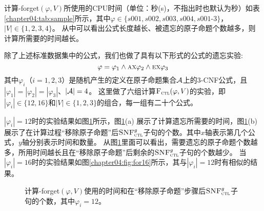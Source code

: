 计算{\CTL-forget}$(\varphi, V)$所使用的CPU时间（单位：秒(s)，不指出时也默认为秒）如表\ref{chapter04:tab:sample}所示，其中$\varphi\in \{s001,s002,s003,s004,s001$-$3\}$，$|V|\in \{1,2,3,4\}$。
从中可以看出公式长度越长、被遗忘的原子命题个数越多，则计算所需要的时间越长。

\begin{table}%
	\small
	\centering
	\caption{计算 {\CTL-forget}$(\varphi, V)$所使用的CPU时间（单位：秒(s)）}\label{chapter04:tab:sample}
\end{table}

除了上述标准数据集中的公式，我们也做了具有以下形式的公式的遗忘实验:
$$\varphi=\varphi_1 \wedge \textsc{a}\textsc{x} \varphi_2 \wedge \textsc{e}\textsc{x} \varphi_3$$
其中$\varphi_i$（$i=1,2,3$）是随机产生的定义在原子命题集合${\cal A}$上的3-CNF公式，且$|\varphi_1| = |\varphi_2| =|\varphi_3|$、$|{\cal A}|=4$。
这里做了六组计算${\textsc{F}_{\textsc{ctl}}}(\varphi,V)$的实验，即$|\varphi_i| \in \{12,16\}$和$|V|\in \{1,2,3\}$的组合，每一组有二十个公式。

$|\varphi_i|=12$时的实验结果如图\ref{chapter04:fig:for12}所示，图\ref{chapter04:fig:for12}(a) 展示了计算遗忘所需要的时间，图\ref{chapter04:fig:for12}(b)展示了在计算过程“移除原子命题”后${\textsc{SNF}_{\textsc{ctl}}^g}$子句的个数。其中$x$轴表示第几个公式，$y$轴分别表示时间和数量。
从图\ref{chapter04:fig:for12}里面可以看出，需要遗忘的原子命题个数越多，所用时间越长且在“移除原子命题”后剩余的${\textsc{SNF}_{\textsc{ctl}}^g}$子句的个数越少。
当$|\varphi_i|=16$时的实验结果如图\ref{chapter04:fig:for16}所示，其与$|\varphi_i|=12$时有相似的结果。

\begin{figure*}[!htb]
	\centering
	\caption{计算{\CTL-forget}$(\varphi, V)$使用的时间和在“移除原子命题”步骤后${\textsc{SNF}_{\textsc{ctl}}^g}$子句的个数，其中$\varphi_i=12$。}
	\label{chapter04:fig:for12}
\end{figure*}

